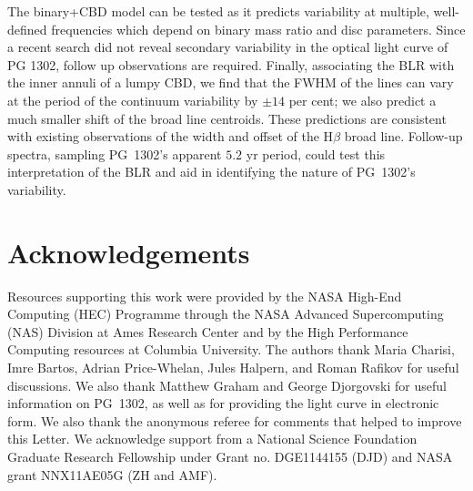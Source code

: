 The binary+CBD model can be tested as it predicts variability at
multiple, well-defined frequencies which depend on binary mass ratio
and disc parameters. Since a recent search \citep{PG1302-Maria}
did not reveal secondary variability in the optical light curve of PG
1302, follow up observations are required.  Finally, associating the
BLR with the inner annuli of a lumpy CBD, we find that
the FWHM of the lines can vary at the period of the continuum variability by $\pm 14$ per cent; we also predict a much smaller shift
of the broad line centroids.  These predictions are consistent with
existing observations of the width and offset of the H$\beta$ broad
line. Follow-up spectra, sampling PG~1302's apparent $5.2$ yr
period, could test this interpretation of the BLR
and aid in identifying the nature of PG~1302's variability.



\vspace{-\baselineskip}
\section*{Acknowledgements}
Resources supporting this work were provided by the NASA High-End
Computing (HEC) Programme through the NASA Advanced
Supercomputing (NAS) Division at Ames Research Center and by
the High Performance Computing resources at Columbia University.
The authors thank Maria Charisi, Imre Bartos, Adrian Price-Whelan,
Jules Halpern, and Roman Rafikov for useful discussions. We
also thank Matthew Graham and George Djorgovski for useful information
on PG~1302, as well as for providing the light curve in electronic
form. We also thank the anonymous referee
for comments that helped to improve this Letter. We acknowledge support from a National Science Foundation
Graduate Research Fellowship under Grant no. DGE1144155 (DJD) and NASA
grant NNX11AE05G (ZH and AMF).

\vspace{-\baselineskip}

%


%

\renewcommand\thesection{\thechapter.\arabic{section}}
